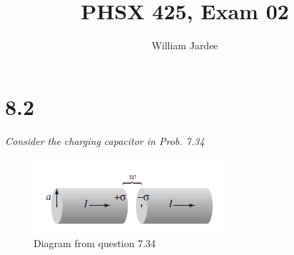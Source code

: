 \documentclass[12pt]{article}
\title{PHSX 425, Exam 02}
\author{William Jardee}
\begin{document}
\maketitle

\section*{8.2}
\emph{Consider the charging capacitor in Prob. 7.34}
\begin{figure}[h]
\centering
\includegraphics[scale=1]{homework08_question1.png}
\caption{Diagram from question 7.34}
\label{fig:1.1}
\end{figure}
\end{document}
